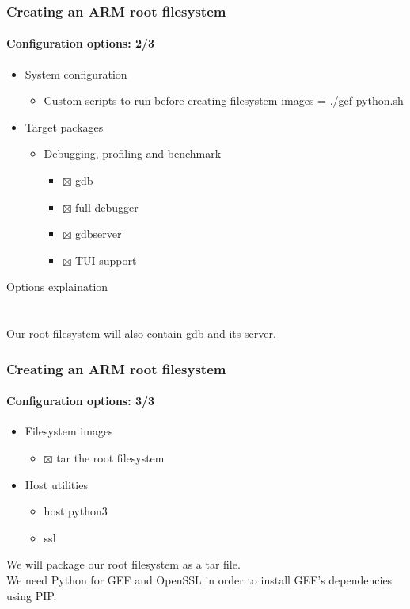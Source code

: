 \begin{frame}
  \frametitle{Creating an ARM root filesystem}
  \framesubtitle{Configuration options: 2/3}
  \begin{itemize}
    \toolchainOptionsList
    \item System configuration
    \begin{itemize}
      \item Custom scripts to run before creating filesystem images = ./gef-python.sh
    \end{itemize}
    \item Target packages
    \begin{itemize}
      \item Debugging, profiling and benchmark
      \begin{itemize}
        \item $\boxtimes$ gdb
        \item $\boxtimes$ full debugger
        \item $\boxtimes$ gdbserver
        \item $\boxtimes$ TUI support
      \end{itemize}
    \end{itemize}
  \end{itemize}
\end{frame}
 {
  Options explaination \\
  \toolchainOptionsDescription \\
  \gefPythonDescription \\
  Our root filesystem will also contain gdb and its server.
}

\begin{frame}
  \frametitle{Creating an ARM root filesystem}
  \framesubtitle{Configuration options: 3/3}
  \begin{itemize}
    \item Filesystem images
    \begin{itemize}
      \item $\boxtimes$ tar the root filesystem
    \end{itemize}
    \item Host utilities
    \begin{itemize}
      \item host python3
      \item ssl
    \end{itemize}
  \end{itemize}
\end{frame}
 {
  We will package our root filesystem as a tar file. \\
  We need Python for GEF and OpenSSL in order to install GEF's dependencies using PIP.
}

